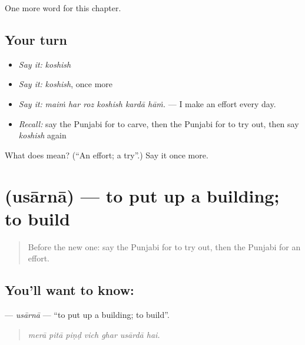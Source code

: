 \begin{grammarlens}[title={What you've built}]
One more word for this chapter.
\end{grammarlens}

\subsection*{Your turn}
\begin{itemize}
\raggedright
  \item \emph{Say it:} \emph{koshish}
  \item \emph{Say it:} \emph{koshish}, once more
  \item \emph{Say it:} \emph{maiṁ har roz koshish kardā hāṁ.} — I make an effort every day.
  \item \emph{Recall:} say the Punjabi for to carve, then the Punjabi for to try out, then say \emph{koshish} again
\end{itemize}

\begin{tcolorbox}[breakable,colback=teal!4,colframe=teal!35!black,title={Before you move on}]
What does  mean? (\textquotedblleft{}An effort; a try\textquotedblright{}.) Say it once more.
\end{tcolorbox}
\section[\texorpdfstring{\pa{ਉਸਾਰਨਾ} (usārnā)}{ਉਸਾਰਨਾ (usārnā)}]{ (usārnā) — to put up a building; to build}

\label{lesson:PA-C363-usarna}



\begin{quote}
Before the new one: say the Punjabi for to try out, then the Punjabi for an effort.
\end{quote}

\subsection*{You'll want to know: }
\textbf{} — \emph{usārnā} — \textquotedblleft{}to put up a building; to build\textquotedblright{}.

\begin{quote}
      
\end{quote}

\begin{quote}
\emph{merā pitā piṇḍ vich ghar usārdā hai.}
\end{quote}

